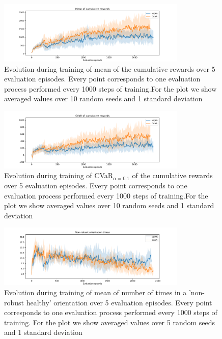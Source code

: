 \begin{figure}[ht]
    \centering
    \includegraphics[width=0.8\textwidth]{images/Walker_offpolicy_expert/mean_train_withstds.pdf}
    \caption{Evolution during training of mean of the cumulative rewards over 5 evaluation episodes.
    Every point corresponds
    to one evaluation process performed every 1000 steps of training.For the plot we
    show averaged values over 10 random seeds and 1 standard deviation}
    \label{fig:mean_walker}
    
    \end{figure}

\begin{figure}[ht]
    \centering
    \includegraphics[width=0.8\textwidth]{images/Walker_offpolicy_expert/cvar_train_withstds.pdf}
    \caption{Evolution during training of CVaR$_{\alpha=0.1}$ of the cumulative rewards over 5 evaluation episodes.
    Every point corresponds to one evaluation process performed every 1000 steps of training.For the plot we
    show averaged values over 10 random seeds and 1 standard deviation}
    \label{fig:cvar_walker}

\end{figure}



\begin{figure}[ht]
    \centering
    \includegraphics[width=0.8\textwidth]{images/Walker_offpolicy_expert/times_exceedvel_withstds.pdf}
    \caption{Evolution during training of mean of number of times in a 'non-robust healthy'
    orientation over  5 evaluation episodes.
    Every point corresponds to one evaluation process performed every 1000 steps of training.
    For the plot we show averaged values over 5 random seeds and 1 standard deviation
    }
    \label{fig:vel_exceed_walker}

\end{figure}

